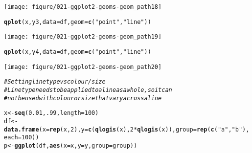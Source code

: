\documentclass[a4paper,titlepage]{tufte-handout}\usepackage[]{graphicx}\usepackage[]{color}
\makeatletter
\def\maxwidth{ %
  \ifdim\Gin@nat@width>\linewidth
    \linewidth
  \else
    \Gin@nat@width
  \fi
}
\newcommand{\hlnum}[1]{\textcolor[rgb]{0.686,0.059,0.569}{#1}}%
\newcommand{\hlstr}[1]{\textcolor[rgb]{0.192,0.494,0.8}{#1}}%
\newcommand{\hlcom}[1]{\textcolor[rgb]{0.678,0.584,0.686}{\textit{#1}}}%
\newcommand{\hlopt}[1]{\textcolor[rgb]{0,0,0}{#1}}%
\newcommand{\hlstd}[1]{\textcolor[rgb]{0.345,0.345,0.345}{#1}}%
\newcommand{\hlkwb}[1]{\textcolor[rgb]{0.69,0.353,0.396}{#1}}%
\newcommand{\hlkwc}[1]{\textcolor[rgb]{0.333,0.667,0.333}{#1}}%
\newcommand{\hlkwd}[1]{\textcolor[rgb]{0.737,0.353,0.396}{\textbf{#1}}}%
\newenvironment{kframe}{%
 \def\at@end@of@kframe{}%
 \ifinner\ifhmode%
  \def\at@end@of@kframe{\end{minipage}}%
  \begin{minipage}{\columnwidth}%
 \fi\fi%
 \def\FrameCommand##1{\hskip\@totalleftmargin \hskip-\fboxsep
 \colorbox{shadecolor}{##1}\hskip-\fboxsep
     \hskip-\linewidth \hskip-\@totalleftmargin \hskip\columnwidth}%
 \MakeFramed {\advance\hsize-\width
   \@totalleftmargin\z@ \linewidth\hsize
   \@setminipage}}%
 {\par\unskip\endMakeFramed%
 \at@end@of@kframe}
\newenvironment{knitrout}{}{} %
\makeatother
\begin{document}
\begin{knitrout}
\begin{kframe}
{\ttfamily\noindent\color{warningcolor}{\#\# Warning: Removed 1 rows containing missing values (geom\_point).\\\#\# Warning: Removed 1 rows containing missing values (geom\_path).}}\end{kframe}
\texttt{[image: figure/021-ggplot2-geoms-geom\_path18]} 
\begin{kframe}\begin{alltt}
\hlkwd{qplot}\hlstd{(x, y3,} \hlkwc{data} \hlstd{= df,} \hlkwc{geom} \hlstd{=} \hlkwd{c}\hlstd{(}\hlstr{"point"}\hlstd{,}\hlstr{"line"}\hlstd{))}
\end{alltt}


{\ttfamily\noindent\color{warningcolor}{\#\# Warning: Removed 1 rows containing missing values (geom\_point).}}\end{kframe}
\texttt{[image: figure/021-ggplot2-geoms-geom\_path19]} 
\begin{kframe}\begin{alltt}
\hlkwd{qplot}\hlstd{(x, y4,} \hlkwc{data} \hlstd{= df,} \hlkwc{geom} \hlstd{=} \hlkwd{c}\hlstd{(}\hlstr{"point"}\hlstd{,}\hlstr{"line"}\hlstd{))}
\end{alltt}
\end{kframe}
\texttt{[image: figure/021-ggplot2-geoms-geom\_path20]} 
\begin{kframe}\begin{alltt}
\hlcom{# Setting line type vs colour/size}
\hlcom{# Line type needs to be applied to a line as a whole, so it can}
\hlcom{# not be used with colour or size that vary across a line}

\hlstd{x} \hlkwb{<-} \hlkwd{seq}\hlstd{(}\hlnum{0.01}\hlstd{,} \hlnum{.99}\hlstd{,} \hlkwc{length}\hlstd{=}\hlnum{100}\hlstd{)}
\hlstd{df} \hlkwb{<-} \hlkwd{data.frame}\hlstd{(}\hlkwc{x} \hlstd{=} \hlkwd{rep}\hlstd{(x,} \hlnum{2}\hlstd{),} \hlkwc{y} \hlstd{=} \hlkwd{c}\hlstd{(}\hlkwd{qlogis}\hlstd{(x),} \hlnum{2} \hlopt{*} \hlkwd{qlogis}\hlstd{(x)),} \hlkwc{group} \hlstd{=} \hlkwd{rep}\hlstd{(}\hlkwd{c}\hlstd{(}\hlstr{"a"}\hlstd{,}\hlstr{"b"}\hlstd{),} \hlkwc{each}\hlstd{=}\hlnum{100}\hlstd{))}
\hlstd{p} \hlkwb{<-} \hlkwd{ggplot}\hlstd{(df,} \hlkwd{aes}\hlstd{(}\hlkwc{x}\hlstd{=x,} \hlkwc{y}\hlstd{=y,} \hlkwc{group}\hlstd{=group))}


\end{alltt}
\end{kframe}
\end{knitrout}
\end{document}
